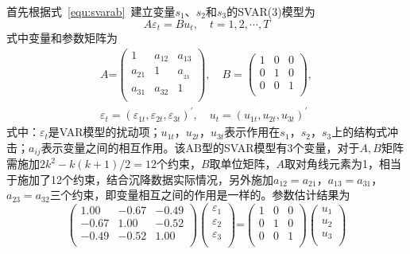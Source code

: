 首先根据式~\ref{equ:svarab}~建立变量$s_1$、$s_2$和$s_3$的SVAR(3)模型为
\begin{equation}
	A{{\varepsilon }_{t}}=B{{u}_{t}},\quad t=1,2,\cdots ,T \nonumber
\end{equation}
式中变量和参数矩阵为
\begin{gather}
  A\text{=}\left( \begin{matrix}
   1 & {{a}_{12}} & {{a}_{13}}  \\
   {{a}_{21}} & 1 & a{}_{_{23}}  \\
   {{a}_{31}} & {{a}_{32}} & 1  \\
\end{matrix} \right),\quad B=\left( \begin{matrix}
   1 & 0 & 0  \\
   0 & 1 & 0  \\
   0 & 0 & 1  \\
\end{matrix} \right), \nonumber \\ 
 {{\varepsilon }_{t}}={{\left( {{\varepsilon }_{1t}},{{\varepsilon }_{2t}},{{\varepsilon }_{3t}} \right)}^{\prime }},\quad {{u}_{t}}={{\left( {{u}_{1t}},{{u}_{2t}},{{u}_{3t}} \right)}^{\prime }} \nonumber 
\end{gather}
式中：$\varepsilon _t$是VAR模型的扰动项；${u}_{1t}$，${u}_{2t}$，${u}_{3t}$表示作用在$s_1$，$s_2$，$s_3$上的结构式冲击；$a_{ij}$表示变量之间的相互作用。该AB型的SVAR模型有3个变量，对于$A,B$矩阵需施加$2k^2-k(k+1)/2=12$个约束，$B$取单位矩阵，$A$取对角线元素为1，相当于施加了12个约束，结合沉降数据实际情况，另外施加$a_{12}=a_{21}$，$a_{13}=a_{31}$，$a_{23}=a_{32}$三个约束，即变量相互之间的作用是一样的。参数估计结果为
\begin{equation}
	\left( \begin{matrix}
   1.00 & -0.67 & -0.49  \\
   -0.67 & 1.00 & -0.52  \\
   -0.49 & -0.52 & 1.00  \\
\end{matrix} \right)\left( \begin{matrix}
   {{\varepsilon }_{1}}  \\
   {{\varepsilon }_{2}}  \\
   {{\varepsilon }_{3}}  \\
\end{matrix} \right)\text{=}\left( \begin{matrix}
   1 & 0 & 0  \\
   0 & 1 & 0  \\
   0 & 0 & 1  \\
\end{matrix} \right)\left( \begin{matrix}
   {{u}_{1}}  \\
   {{u}_{2}}  \\
   {{u}_{3}}  \\
\end{matrix} \right) \nonumber
\end{equation}

